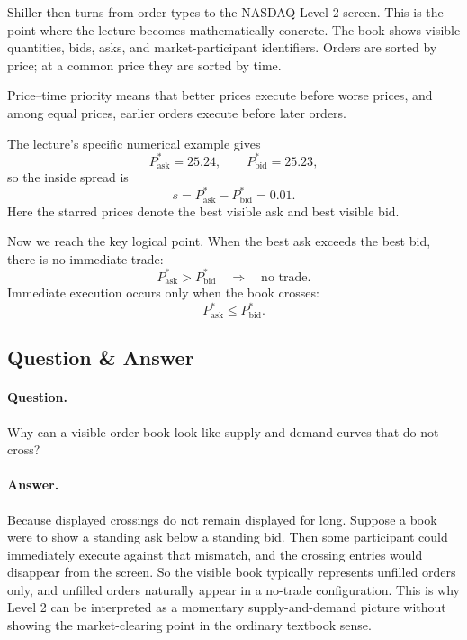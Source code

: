 Shiller then turns from order types to the NASDAQ Level 2 screen. This is the point where the lecture becomes mathematically concrete. The book shows visible quantities, bids, asks, and market-participant identifiers. Orders are sorted by price; at a common price they are sorted by time.

\begin{remark}
Price--time priority means that better prices execute before worse prices, and among equal prices, earlier orders execute before later orders.
\end{remark}

The lecture's specific numerical example gives
\begin{equation}
P_{\text{ask}}^{*}=25.24,
\qquad
P_{\text{bid}}^{*}=25.23,
\end{equation}
so the inside spread is
\begin{equation}
s = P_{\text{ask}}^{*}-P_{\text{bid}}^{*}=0.01.
\end{equation}
Here the starred prices denote the best visible ask and best visible bid.

Now we reach the key logical point. When the best ask exceeds the best bid, there is no immediate trade:
\begin{equation}
P_{\text{ask}}^{*} > P_{\text{bid}}^{*}
\quad \Longrightarrow \quad
\text{no trade}.
\end{equation}
Immediate execution occurs only when the book crosses:
\begin{equation}
P_{\text{ask}}^{*} \le P_{\text{bid}}^{*}.
\end{equation}

\subsection{Question \& Answer}

\paragraph{Question.} Why can a visible order book look like supply and demand curves that do not cross?

\paragraph{Answer.} Because displayed crossings do not remain displayed for long. Suppose a book were to show a standing ask below a standing bid. Then some participant could immediately execute against that mismatch, and the crossing entries would disappear from the screen. So the visible book typically represents unfilled orders only, and unfilled orders naturally appear in a no-trade configuration. This is why Level 2 can be interpreted as a momentary supply-and-demand picture without showing the market-clearing point in the ordinary textbook sense.

